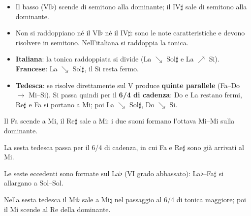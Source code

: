 \begin{regola}
	\label{reg:condotta_seste}
	\begin{itemize}
		\item Il basso (VI$\flat$) scende di semitono alla dominante; il IV$\sharp$ sale di semitono alla dominante.
		\item Non si raddoppiano né il VI$\flat$ né il IV$\sharp$: sono le note caratteristiche e devono risolvere in semitono. Nell'italiana si raddoppia la tonica.
		\item \textbf{Italiana}: la tonica raddoppiata si divide (La $\searrow$ Sol$\sharp$ e La $\nearrow$ Si). \textbf{Francese}: La $\searrow$ Sol$\sharp$, il Si resta fermo.
		\item \textbf{Tedesca}: se risolve direttamente sul V produce \textbf{quinte parallele} (Fa--Do $\rightarrow$ Mi--Si). Si passa quindi per il \textbf{6/4 di cadenza}: Do e La restano fermi, Re$\sharp$ e Fa si portano a Mi; poi La $\searrow$ Sol$\sharp$, Do $\searrow$ Si.
	\end{itemize}
\end{regola}

\begin{esempio}
	\label{ex:italiana_francese_minore}
	Il Fa scende a Mi, il Re$\sharp$ sale a Mi: i due suoni formano l'ottava Mi--Mi sulla dominante.
\end{esempio}

\begin{esempio}
	\label{ex:tedesca_minore}
	La sesta tedesca passa per il 6/4 di cadenza, in cui Fa e Re$\sharp$ sono già arrivati al Mi.
\end{esempio}

\begin{esempio}
	\label{ex:italiana_francese_maggiore}
	Le seste eccedenti sono formate sul La$\flat$ (VI grado abbassato): La$\flat$--Fa$\sharp$ si allargano a Sol--Sol.
\end{esempio}

\begin{esempio}
	\label{ex:tedesca_maggiore}
	Nella sesta tedesca il Mi$\flat$ sale a Mi$\natural$ nel passaggio al 6/4 di tonica maggiore; poi il Mi scende al Re della dominante.
\end{esempio}

